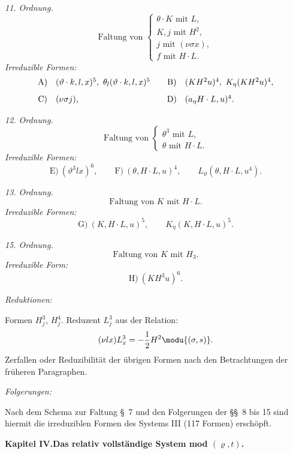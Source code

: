 \noindent\emph{11. Ordnung.}
\[
\text{Faltung von }\left\{\begin{array}{l}
\theta\cdot K\text{ mit }L,\\
K,j\text{ mit }H^2,\\
j\text{ mit }(\nu\sigma x),\\
f\text{ mit }H\cdot L.
\end{array}\right.
\]
\noindent\emph{Irreduzible Formen:}
\[
\begin{array}{c@{\quad}l@{\qquad}c@{\quad}l}
\text{A)}&(\vartheta\cdot k,l,x)^5,
\ \theta_l(\vartheta\cdot k,l,x)^5&
\text{B)}&(KH^2u)^4,
\ K_\eta(KH^2u)^4,\\[0.8em]
\text{C)}&(\nu\sigma j),&
\text{D)}&(a_\eta H\cdot L,u)^4.
\end{array}
\]

\noindent\emph{12. Ordnung.}
\[
\text{Faltung von }\left\{\begin{array}{l}
\theta^3\text{ mit }L,\\
\theta\text{ mit }H\cdot L.
\end{array}\right.
\]
\noindent\emph{Irreduzible Formen:}
\[
\text{E)}\ (\vartheta^3lx)^6,
\qquad
\text{F)}\ (\theta,H\cdot L,u)^4,
\qquad L_\vartheta(\theta,H\cdot L,u^4).
\]

\noindent\emph{13. Ordnung.}
\[
\text{Faltung von }K\text{ mit }H\cdot L.
\]
\noindent\emph{Irreduzible Formen:}
\[
\text{G)}\ (K,H\cdot L,u)^5,
\qquad K_\eta(K,H\cdot L,u)^5.
\]

\noindent\emph{15. Ordnung.}
\[
\text{Faltung von }K\text{ mit }H_3.
\]
\noindent\emph{Irreduzible Form:}
\[
\text{H)}\ (KH^3u)^6.
\]

\noindent\emph{Reduktionen:}

Formen $H_j^3$, $H_j^4$. Reduzent $L_j^3$ aus der Relation:
\[
(\nu lx)L_x^3=-\frac12H^2\modu{(\sigma,s)}.
\]
Zerfallen oder Reduzibilität der übrigen Formen nach den Betrachtungen der früheren Paragraphen.

\noindent\emph{Folgerungen:}

Nach dem Schema zur Faltung \S\ 7 und den Folgerungen der \S\S\ 8 bis 15 sind hiermit die irreduziblen Formen des Systems III (117 Formen) erschöpft.



\clearpage

\begin{center}
{\Large\bfseries Kapitel IV.\quad Das relativ vollständige System mod $(\varrho,t)$.}
\end{center}

